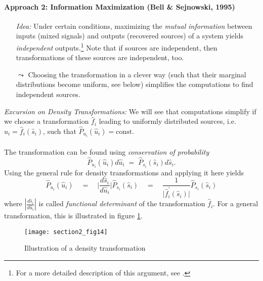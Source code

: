 \paragraph{Approach 2: Information Maximization (Bell \& Sejnowski, 1995)}
\label{sec:ICA-BellSejnowski}
\begin{itemize}
\item[\emph{Idea:}] Under certain conditions, maximizing the
  \emph{mutual information} between inputs (mixed signals) and outputs
  (recovered sources) of a system yields \emph{independent} outputs.\footnote{For a more detailed description of this argument, see \textcite{BellSejnowski1995}.} Note that if sources are independent, then
  transformations of these sources are independent, too.
\item[$\leadsto$] Choosing the transformation in a clever way (such
  that their marginal distributions become uniform, see below)
  simplifies the computations to find independent sources.
\end{itemize}
\emph{Excursion on Density Transformations:} We will see that
computations simplify if we choose a transformation $\widehat{f}_i$
leading to uniformly distributed sources, i.e. $\widehat{u}_i =
\widehat{f}_i(\widehat{s}_i)$, such that
$\widehat{P}_{u_i}(\widehat{u}_i) = \mathrm{const.}$
\\\\
The transformation can be found using \emph{conservation of probability}
\begin{equation}
	\widehat{P}_{u_i}(\widehat{u}_i) d \widehat{u}_i 
	\; =  \; \widehat{P}_{s_i} (\widehat{s}_i) d \widehat{s}_i.
\end{equation}
Using the general rule for density transformations and applying it here yields
\begin{equation}
	\widehat{P}_{u_i}(\widehat{u}_i) \quad
	 =  \quad \bigg| 
		\frac{d \widehat{s}_i}{d \widehat{u}_i} \bigg| 
			 \widehat{P}_{s_i}(\widehat{s}_i) \quad
	 =  \quad \frac{1}{\big| \widehat{f}_i^{'} (\widehat{s}_i) \big|} 
		\widehat{P}_{s_i}(\widehat{s}_i)
\end{equation}
where $\left|\frac{d \widehat{s}_i}{d \widehat{u}_i} \right|$ is
called \emph{functional determinant} of the transformation
$\widehat{f}_i$. For a general transformation, this is illustrated in
figure \ref{fig:densityTransformation}.
\begin{figure}[h]
  \centering
  \texttt{[image: section2\_fig14]}  
  \caption{Illustration of a density transformation}
  \label{fig:densityTransformation}
\end{figure}
